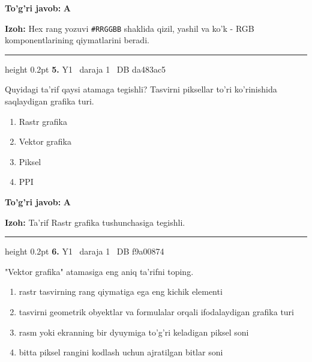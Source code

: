 \documentclass[10pt,a4paper,oneside]{article}
\begin{document}
\begin{tcolorbox}[enhanced,breakable,colback=teal!4,colframe=teal!45!black,boxrule=0.45pt,arc=1.2mm,left=2.8mm,right=2.8mm,top=2mm,bottom=2mm,before skip=2mm,after skip=2mm]
\textbf{\color{teal}To'g'ri javob:} \textbf{A}
\par\smallskip
\textbf{Izoh:} Hex rang yozuvi \texttt{\#RRGGBB} shaklida qizil, yashil va ko'k - RGB komponentlarining qiymatlarini beradi.
\end{tcolorbox}
\vspace{2mm}\hrule height 0.2pt \vspace{4mm}
\hypertarget{q5}{\textbf{\color{ink}5.}}  {\color{muted}\scriptsize Y1 \textbullet\ daraja 1 \textbullet\ DB da483ac5}
\par
Quyidagi ta'rif qaysi atamaga tegishli? Tasvirni piksellar to'ri ko'rinishida saqlaydigan grafika turi.
\begin{enumerate}[label=\Alph*),leftmargin=9mm]
\item Rastr grafika
\item Vektor grafika
\item Piksel
\item PPI
\end{enumerate}
\begin{tcolorbox}[enhanced,breakable,colback=teal!4,colframe=teal!45!black,boxrule=0.45pt,arc=1.2mm,left=2.8mm,right=2.8mm,top=2mm,bottom=2mm,before skip=2mm,after skip=2mm]
\textbf{\color{teal}To'g'ri javob:} \textbf{A}
\par\smallskip
\textbf{Izoh:} Ta'rif Rastr grafika tushunchasiga tegishli.
\end{tcolorbox}
\vspace{2mm}\hrule height 0.2pt \vspace{4mm}
\hypertarget{q6}{\textbf{\color{ink}6.}}  {\color{muted}\scriptsize Y1 \textbullet\ daraja 1 \textbullet\ DB f9a00874}
\par
"Vektor grafika" atamasiga eng aniq ta'rifni toping.
\begin{enumerate}[label=\Alph*),leftmargin=9mm]
\item rastr tasvirning rang qiymatiga ega eng kichik elementi
\item tasvirni geometrik obyektlar va formulalar orqali ifodalaydigan grafika turi
\item rasm yoki ekranning bir dyuymiga to'g'ri keladigan piksel soni
\item bitta piksel rangini kodlash uchun ajratilgan bitlar soni
\end{enumerate}
\end{document}
